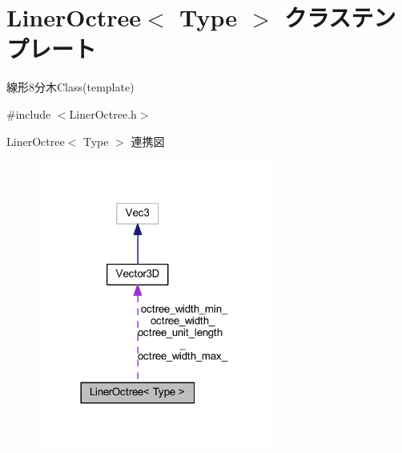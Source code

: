 \hypertarget{class_liner_octree}{}\section{Liner\+Octree$<$ Type $>$ クラステンプレート}
\label{class_liner_octree}


線形8分木\+Class(template)  




{\ttfamily \#include $<$Liner\+Octree.\+h$>$}



Liner\+Octree$<$ Type $>$ 連携図\nopagebreak
\begin{figure}[H]
\begin{center}
\leavevmode
\includegraphics[width=218pt]{class_liner_octree__coll__graph}
\end{center}
\end{figure}

